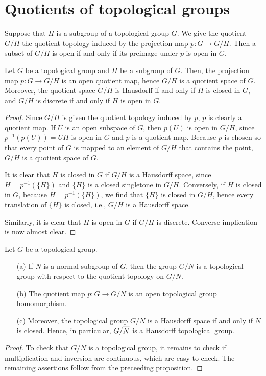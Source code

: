 \section{Quotients of topological groups}

Suppose that $H$ is a subgroup of a topological group $G$.
We give the quotient $G/H$ the quotient topology induced by the projection map $p: G\rightarrow G/H$.
Then a subset of $G/H$ is open if and only if its preimage under $p$ is open in $G$.
\begin{prop}
    Let $G$ be a topological group and $H$ be a subgroup of $G$.
    Then, the projection map $p: G\rightarrow G/H$ is an open quotient map, hence $G/H$ is a quotient space of $G$.
    Moreover, the quotient space $G/H$ is Hausdorff if and only if $H$ is closed in $G$, and $G/H$ is discrete if and only if $H$ is open in $G$.
\end{prop}
\begin{proof}
    Since $G/H$ is given the quotient topology induced by $p$, $p$ is clearly a quotient map.
    If $U$ is an open subspace of $G$, then $p(U)$ is open in $G/H$, since $p^{-1}(p(U))=UH$ is open in $G$ and $p$ is a quotient map.
    Because $p$ is chosen so that every point of $G$ is mapped to an element of $G/H$ that contains the point, $G/H$ is a quotient space of $G$.

    It is clear that $H$ is closed in $G$ if $G/H$ is a Hausdorff space, since $H=p^{-1}(\{H\})$ and $\{H\}$ is a closed singletone in $G/H$.
    Conversely, if $H$ is closed in $G$, because $H=p^{-1}(\{H\})$, we find that $\{H\}$ is closed in $G/H$, hence every translation of $\{H\}$ is closed, i.e., $G/H$ is a Hausdorff space.

    Similarly, it is clear that $H$ is open in $G$ if $G/H$ is discrete.
    Converse implication is now almost clear.
\end{proof}

\begin{thm}
    Let $G$ be a topological group.
    \begin{enumerate}
        \item[(a)]
        {
            If $N$ is a normal subgroup of $G$, then the group $G/N$ is a topological group with respect to the quotient topology on $G/N$.
        }
        \item[(b)]
        {
            The quotient map $p: G\rightarrow G/N$ is an open topological group homomorphism.
        }
        \item[(c)]
        {
            Moreover, the topological group $G/N$ is a Hausdorff space if and only if $N$ is closed.
            Hence, in particular, $G/\overline{N}$ is a Hausdorff topological group.
        }
    \end{enumerate}
\end{thm}
\begin{proof}
    To check that $G/N$ is a topological group, it remains to check if multiplication and inversion are continuous, which are easy to check.
    The remaining assertions follow from the preceeding proposition.
\end{proof}

